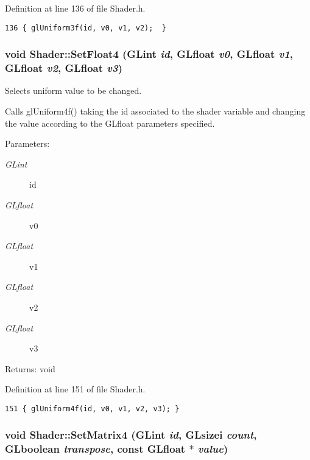 Definition at line 136 of file Shader.h.

\begin{Code}\begin{verbatim}136 { glUniform3f(id, v0, v1, v2);  }
\end{verbatim}
\end{Code}


\hypertarget{class_shader_4be6e8b9886f58bc5615d2f736c8885c}{
\subsubsection[SetFloat4]{\setlength{\rightskip}{0pt plus 5cm}void Shader::SetFloat4 (GLint {\em id}, \/  GLfloat {\em v0}, \/  GLfloat {\em v1}, \/  GLfloat {\em v2}, \/  GLfloat {\em v3})}}
\label{class_shader_4be6e8b9886f58bc5615d2f736c8885c}


Selects uniform value to be changed. 

Calls glUniform4f() taking the id associated to the shader variable and changing the value according to the GLfloat parameters specified.

\begin{Desc}
\item[Parameters:]
\begin{description}
\item[{\em GLint}]id \item[{\em GLfloat}]v0 \item[{\em GLfloat}]v1 \item[{\em GLfloat}]v2 \item[{\em GLfloat}]v3 \end{description}
\end{Desc}
\begin{Desc}
\item[Returns:]void \end{Desc}


Definition at line 151 of file Shader.h.

\begin{Code}\begin{verbatim}151 { glUniform4f(id, v0, v1, v2, v3); }
\end{verbatim}
\end{Code}


\hypertarget{class_shader_61b49dc75fb1842ec58845e9912f824d}{
\subsubsection[SetMatrix4]{\setlength{\rightskip}{0pt plus 5cm}void Shader::SetMatrix4 (GLint {\em id}, \/  GLsizei {\em count}, \/  GLboolean {\em transpose}, \/  const GLfloat $\ast$ {\em value})}}
\label{class_shader_61b49dc75fb1842ec58845e9912f824d}


